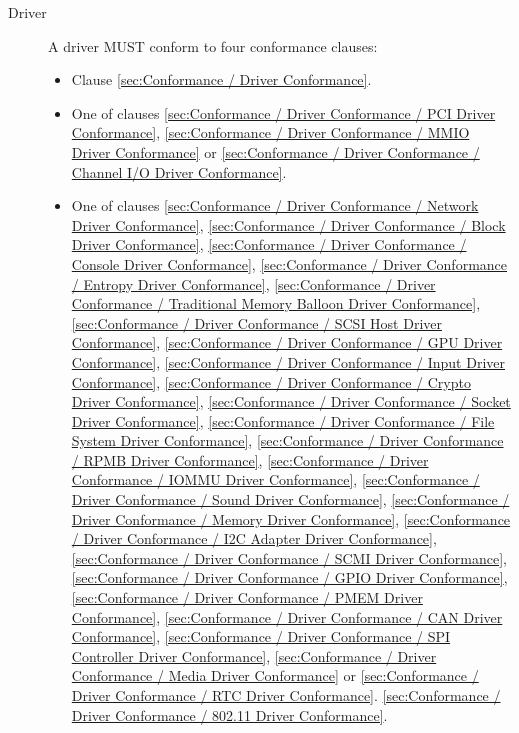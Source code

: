 \begin{description}
\item[Driver] A driver MUST conform to four conformance clauses:
  \begin{itemize}
    \item Clause \ref{sec:Conformance / Driver Conformance}.
    \item One of clauses \ref{sec:Conformance / Driver Conformance / PCI Driver Conformance}, \ref{sec:Conformance / Driver Conformance / MMIO Driver Conformance} or \ref{sec:Conformance / Driver Conformance / Channel I/O Driver Conformance}.
    \item One of clauses
\ref{sec:Conformance / Driver Conformance / Network Driver Conformance},
\ref{sec:Conformance / Driver Conformance / Block Driver Conformance},
\ref{sec:Conformance / Driver Conformance / Console Driver Conformance},
\ref{sec:Conformance / Driver Conformance / Entropy Driver Conformance},
\ref{sec:Conformance / Driver Conformance / Traditional Memory Balloon Driver Conformance},
\ref{sec:Conformance / Driver Conformance / SCSI Host Driver Conformance},
\ref{sec:Conformance / Driver Conformance / GPU Driver Conformance},
\ref{sec:Conformance / Driver Conformance / Input Driver Conformance},
\ref{sec:Conformance / Driver Conformance / Crypto Driver Conformance},
\ref{sec:Conformance / Driver Conformance / Socket Driver Conformance},
\ref{sec:Conformance / Driver Conformance / File System Driver Conformance},
\ref{sec:Conformance / Driver Conformance / RPMB Driver Conformance},
\ref{sec:Conformance / Driver Conformance / IOMMU Driver Conformance},
\ref{sec:Conformance / Driver Conformance / Sound Driver Conformance},
\ref{sec:Conformance / Driver Conformance / Memory Driver Conformance},
\ref{sec:Conformance / Driver Conformance / I2C Adapter Driver Conformance},
\ref{sec:Conformance / Driver Conformance / SCMI Driver Conformance},
\ref{sec:Conformance / Driver Conformance / GPIO Driver Conformance},
\ref{sec:Conformance / Driver Conformance / PMEM Driver Conformance},
\ref{sec:Conformance / Driver Conformance / CAN Driver Conformance},
\ref{sec:Conformance / Driver Conformance / SPI Controller Driver Conformance},
\ref{sec:Conformance / Driver Conformance / Media Driver Conformance} or
\ref{sec:Conformance / Driver Conformance / RTC Driver Conformance}.
\ref{sec:Conformance / Driver Conformance / 802.11 Driver Conformance}.


\end{itemize}
\end{description}
